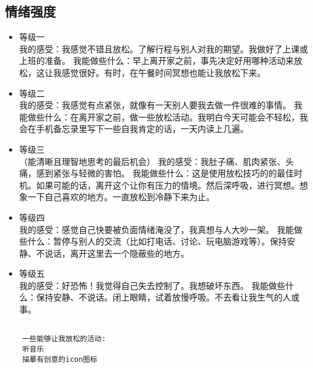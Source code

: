 \documentclass{assignment}
\begin{document}
\begin{problem}
\subsection{情绪强度}
\begin{itemize}
    \item 等级一\\
    我的感受：我感觉不错且放松。了解行程与别人对我的期望。我做好了上课或上班的准备。
    我能做些什么：早上离开家之前，事先决定好用哪种活动来放松，这让我感觉很好。有时，在午餐时间冥想也能让我放松下来。
    \item 等级二\\
    我的感受：我感觉有点紧张，就像有一天别人要我去做一件很难的事情。
    我能做些什么：在离开家之前，做一些放松活动。我明白今天可能会不轻松，我会在手机备忘录里写下一些自我肯定的话，一天内读上几遍。
    \item 等级三\\（能清晰且理智地思考的最后机会）
    我的感受：我肚子痛、肌肉紧张、头痛，感到紧张与轻微的害怕。
    我能做些什么：这是使用放松技巧的的最佳时机。如果可能的话，离开这个让你有压力的情境。然后深呼吸，进行冥想。想象一下自己喜欢的地方。一直放松到冷静下来为止。
    \item 等级四\\
    我的感受：感觉自己快要被负面情绪淹没了，我真想与人大吵一架。
    我能做些什么：暂停与别人的交流（比如打电话、讨论、玩电脑游戏等）。保持安静、不说话，离开这里去一个隐蔽些的地方。
    \item  等级五\\
    我的感受：好恐怖！我觉得自己失去控制了。我想破坏东西。
    我能做些什么：保持安静、不说话。闭上眼睛，试着放慢呼吸。不去看让我生气的人或事。
\end{itemize}





\begin{verbatim}
    
    一些能够让我放松的活动:
    听音乐
    描摹有创意的icon图标


\end{verbatim}

\end{problem}

\end{document}

